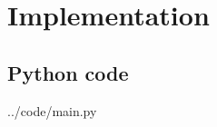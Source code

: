 \documentclass{article}
\begin{document}
\pagebreak
\section{Implementation}
\subsection{Python code}

{../code/main.py}


%
\end{document}
